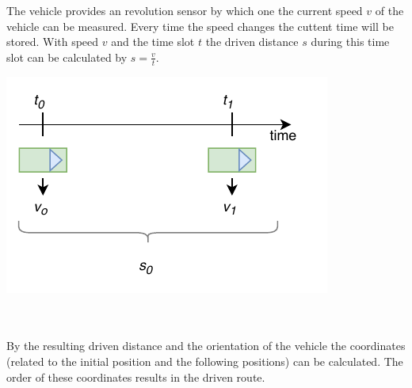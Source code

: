 \begin{minipage}{0.5\textwidth}
The vehicle provides an revolution sensor by which one the current speed $v$ of the vehicle can be measured. Every time the speed changes the cuttent time will be stored. With speed $v$ and the time slot $t$ the driven distance $s$ during this time slot can be calculated by $s=\frac{v}{t}$.
\end{minipage}
\begin{minipage}{0.5\textwidth}
	\centering
	\includegraphics[scale=0.8]{sources/mapping/distance.pdf}
\end{minipage}
\\
\\
By the resulting driven distance and the orientation of the vehicle the coordinates (related to the initial position and the following positions) can be calculated. The order of these coordinates results in the driven route.

